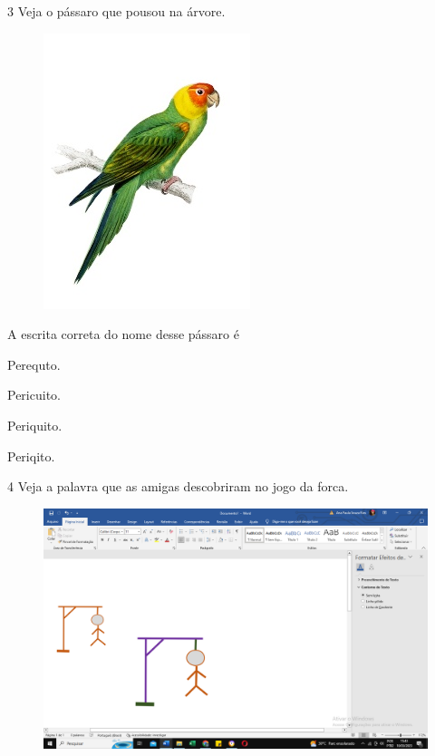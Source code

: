 \num{3} Veja o pássaro que pousou na árvore.

\begin{figure}[htpb!]
\centering
\includegraphics[width=.5\textwidth]{media/image165.jpeg}
\end{figure}


A escrita correta do nome desse pássaro é

\begin{escolha}
\item Perequto.

\item Pericuito.

\item Periquito.

\item Periqito.
\end{escolha}

\num{4} Veja a palavra que as amigas descobriram no jogo da forca.

\begin{figure}[htpb!]
\centering
\includegraphics[width=.5\textwidth]{media/image166.png}
\end{figure}

